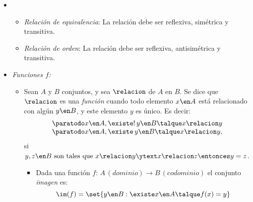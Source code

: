 \begin{itemize}[label={\tiny{}}]
\begin{enumerate}[label=\tiny\faIcon{poop}]
        \end{enumerate}
  \item
        \begin{itemize}[label=\tiny{}]
          \item \textit{Relación de equivalencia}: La relación debe ser reflexiva, simétrica y transitiva.
          \item \textit{Relación de orden}: La relación debe ser reflexiva, antisimétrica y transitiva.
        \end{itemize}

  \item \hypertarget{teoria-1:funciones}{\textit{Funciones $f$:}}

        \begin{itemize}[label=\tiny{}]
          \item
                Sean $A$ y  $B$ conjuntos, y sea $\relacion$ de $A$ en $B$. Se dice que
                $\relacion$ es una \textit{función} cuando todo elemento $x \en A$ está relacionado con algún
                $y \en B$, y este elemento $y$ es único. Es decir:
                $$\begin{array}{l}
                    \paratodo x \en A, \existe!\, y \en B \talque x \relacion y \\
                    \paratodo x \en A, \existe\, y \en B \talque x\relacion y,
                  \end{array}
                $$
                si  $y, z \en B \text{ son tales que } x \relacion y \ytext x \relacion z \entonces y = z$.

                \begin{itemize}[label=\tiny{}]
                  \item Dada una función $f:\, A\,(dominio) \to B\,(codominio)$
                        el conjunto \textit{imagen} es:
                        $$
                          \im(f)= \set{y \en B : \existe x \en A \talque f(x) = y}
                        $$


\end{itemize}
\end{itemize}
\end{itemize}
